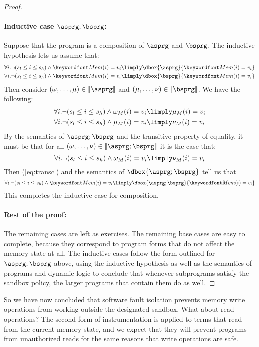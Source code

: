 \documentclass[11pt,twoside]{scrartcl}
\begin{document}
\begin{proof}
\paragraph{Inductive case $\asprg;\bsprg$:}
Suppose that the program is a composition of $\asprg$ and $\bsprg$. The inductive hypothesis lets us assume that:
\begin{align}
\forall i . \lnot(s_l \le i \le s_h)  \land \pderef{i}=v_i &\limply \dbox{\asprg}{\pderef{i}=v_i} \\
\forall i . \lnot(s_l \le i \le s_h)  \land \pderef{i}=v_i &\limply \dbox{\bsprg}{\pderef{i}=v_i}
\end{align}
Then consider $(\omega,\ldots,\mu) \in \llbracket\asprg\rrbracket$ and $(\mu,\ldots,\nu) \in \llbracket\bsprg\rrbracket$. We have the following:
\begin{align}
\label{eq:trans1}
\forall i . \lnot(s_l \le i \le s_h)  \land \omega_M(i)=v_i &\limply \mu_M(i)=v_i \\
\label{eq:trans2}
\forall i . \lnot(s_l \le i \le s_h)  \land \mu_M(i)=v_i &\limply \nu_M(i)=v_i
\end{align}
By the semantics of $\asprg;\bsprg$ and the transitive property of equality, it must be that for all $(\omega,\ldots,\nu)\in\llbracket\asprg;\bsprg\rrbracket$ it is the case that:
\begin{equation}
\label{eq:transc}
\forall i . \lnot(s_l \le i \le s_h)  \land \omega_M(i)=v_i \limply \nu_M(i)=v_i
\end{equation}
Then (\ref{eq:transc}) and the semantics of $\dbox{\asprg;\bsprg}$ tell us that 
\begin{equation}
\forall i . \lnot(s_l \le i \le s_h)  \land \pderef{i}=v_i \limply \dbox{\asprg;\bsprg}{\pderef{i}=v_i}
\end{equation}
This completes the inductive case for composition.

\paragraph{Rest of the proof:}
The remaining cases are left as exercises. The remaining base cases are easy to complete, because they correspond to program forms that do not affect the memory state at all. The inductive cases follow the form outlined for $\asprg;\bsprg$ above, using the inductive hypothesis as well as the semantics of programs and dynamic logic to conclude that whenever subprograms satisfy the sandbox policy, the larger programs that contain them do as well.
\end{proof}
So we have now concluded that software fault isolation prevents memory write operations from working outside the designated sandbox. What about read operations? The second form of instrumentation is applied to terms that read from the current memory state, and we expect that they will prevent programs from unauthorized reads for the same reasons that write operations are safe.
\end{document}

